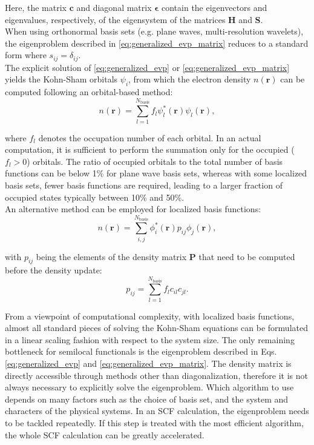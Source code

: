 \documentclass{report}
\begin{document}
Here, the matrix $\boldsymbol{c}$ and diagonal matrix $\boldsymbol{\epsilon}$ contain the eigenvectors and eigenvalues, respectively, of the eigensystem of the matrices $\boldsymbol{H}$ and $\boldsymbol{S}$.\\

When using orthonormal basis sets (e.g. plane waves, multi-resolution wavelets), the eigenproblem described in \ref{eq:generalized_evp_matrix} reduces to a standard form where $s_{ij}=\delta_{ij}$.\\

The explicit solution of \ref{eq:generalized_evp} or \ref{eq:generalized_evp_matrix} yields the Kohn-Sham orbitals $\psi_i$, from which the electron density $n(\boldsymbol{r})$ can be computed following an orbital-based method:\\
\begin{equation}
\label{eq:orbital_update}
n(\boldsymbol{r}) = \sum_{l=1}^{N_\text{basis}} f_l \psi_l^*(\boldsymbol{r}) \psi_l(\boldsymbol{r}) ,
\end{equation}

where $f_l$ denotes the occupation number of each orbital.  In an actual computation, it is sufficient to perform the summation only for the occupied ($f_l > 0$) orbitals.  The ratio of occupied orbitals to the total number of basis functions can be below 1\% for plane wave basis sets, whereas with some localized basis sets, fewer basis functions are required, leading to a larger fraction of occupied states typically between 10\% and 50\%.\\

An alternative method can be employed for localized basis functions:\\
\begin{equation}
\label{eq:density_matrix_update}
n(\boldsymbol{r}) = \sum_{i,j}^{N_\text{basis}} \phi_i^*(\boldsymbol{r}) p_{ij} \phi_j(\boldsymbol{r}) ,
\end{equation}

with $p_{ij}$ being the elements of the density matrix $\boldsymbol{P}$ that need to be computed before the density update:\\
\begin{equation}
\label{eq:density_matrix}
p_{ij} = \sum_{l=1}^{N_\text{basis}} f_l c_{il} c_{jl} .
\end{equation}

From a viewpoint of computational complexity, with localized basis functions, almost all standard pieces of solving the Kohn-Sham equations can be formulated in a linear scaling fashion with respect to the system size.  The only remaining bottleneck for semilocal functionals is the eigenproblem described in Eqs. \ref{eq:generalized_evp} and \ref{eq:generalized_evp_matrix}.  The density matrix is directly accessible through methods other than diagonalization, therefore it is not always necessary to explicitly solve the eigenproblem.  Which algorithm to use depends on many factors such as the choice of basis set, and the system and characters of the physical systems.  In an SCF calculation, the eigenproblem needs to be tackled repeatedly.  If this step is treated with the most efficient algorithm, the whole SCF calculation can be greatly accelerated.\\
\end{document}
